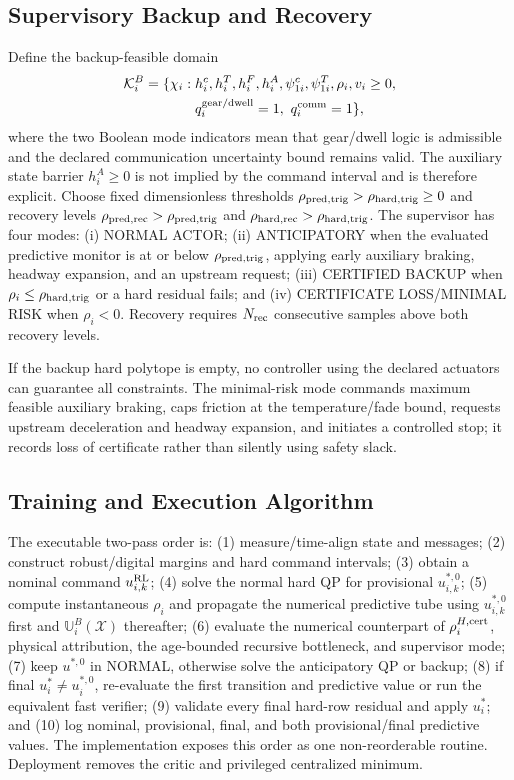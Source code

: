 \subsection{Supervisory Backup and Recovery}
Define the backup-feasible domain
\begin{equation}
\begin{split}
\mathcal K_i^B=\{\chi_i:\;&h_i^c,h_i^T,h_i^F,h_i^A,\psi_{1i}^c,\psi_{1i}^T,\rho_i,v_i\ge0,\\
&q_i^{\rm gear/dwell}=1,\ q_i^{\rm comm}=1\},
\end{split}\label{eq:backupdomain}
\end{equation}
where the two Boolean mode indicators mean that gear/dwell logic is admissible and the declared communication uncertainty bound remains valid. The auxiliary state barrier $h_i^A\ge0$ is not implied by the command interval and is therefore explicit. Choose fixed dimensionless thresholds $\rho_{\rm pred,trig}>\rho_{\rm hard,trig}\ge0$ and recovery levels $\rho_{\rm pred,rec}>\rho_{\rm pred,trig}$ and $\rho_{\rm hard,rec}>\rho_{\rm hard,trig}$. The supervisor has four modes: (i) NORMAL ACTOR; (ii) ANTICIPATORY when the evaluated predictive monitor is at or below $\rho_{\rm pred,trig}$, applying early auxiliary braking, headway expansion, and an upstream request; (iii) CERTIFIED BACKUP when $\rho_i\le\rho_{\rm hard,trig}$ or a hard residual fails; and (iv) CERTIFICATE LOSS/MINIMAL RISK when $\rho_i<0$. Recovery requires $N_{\rm rec}$ consecutive samples above both recovery levels.

If the backup hard polytope is empty, no controller using the declared actuators can guarantee all constraints. The minimal-risk mode commands maximum feasible auxiliary braking, caps friction at the temperature/fade bound, requests upstream deceleration and headway expansion, and initiates a controlled stop; it records loss of certificate rather than silently using safety slack.

\subsection{Training and Execution Algorithm}
The executable two-pass order is: (1) measure/time-align state and messages; (2) construct robust/digital margins and hard command intervals; (3) obtain a nominal command $u_{i,k}^{\rm RL}$; (4) solve the normal hard QP for provisional $u_{i,k}^{*,0}$; (5) compute instantaneous $\rho_i$ and propagate the numerical predictive tube using $u_{i,k}^{*,0}$ first and $\mathbb U_i^B(\mathcal X)$ thereafter; (6) evaluate the numerical counterpart of $\rho_i^{H,{\rm cert}}$, physical attribution, the age-bounded recursive bottleneck, and supervisor mode; (7) keep $u^{*,0}$ in NORMAL, otherwise solve the anticipatory QP or backup; (8) if final $u_i^*\ne u_i^{*,0}$, re-evaluate the first transition and predictive value or run the equivalent fast verifier; (9) validate every final hard-row residual and apply $u_i^*$; and (10) log nominal, provisional, final, and both provisional/final predictive values. The implementation exposes this order as one non-reorderable routine. Deployment removes the critic and privileged centralized minimum.
